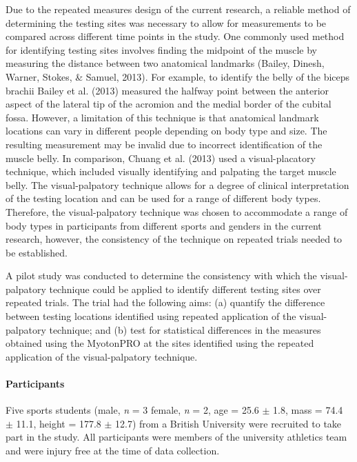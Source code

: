 \documentclass[man,floatsintext]{apa6}
\let\oldparagraph\paragraph
\renewcommand{\paragraph}[1]{\oldparagraph{#1}\mbox{}}
\begin{document}
Due to the repeated measures design of the current research, a reliable method of determining the testing sites was necessary to allow for measurements to be compared across different time points in the study.
One commonly used method for identifying testing sites involves finding the midpoint of the muscle by measuring the distance between two anatomical landmarks (Bailey, Dinesh, Warner, Stokes, \& Samuel, 2013).
For example, to identify the belly of the biceps brachii Bailey et al. (2013) measured the halfway point between the anterior aspect of the lateral tip of the acromion and the medial border of the cubital fossa.
However, a limitation of this technique is that anatomical landmark locations can vary in different people depending on body type and size.
The resulting measurement may be invalid due to incorrect identification of the muscle belly.
In comparison, Chuang et al. (2013) used a visual-placatory technique, which included visually identifying and palpating the target muscle belly.
The visual-palpatory technique allows for a degree of clinical interpretation of the testing location and can be used for a range of different body types.
Therefore, the visual-palpatory technique was chosen to accommodate a range of body types in participants from different sports and genders in the current research, however, the consistency of the technique on repeated trials needed to be established.

A pilot study was conducted to determine the consistency with which the visual-palpatory technique could be applied to identify different testing sites over repeated trials.
The trial had the following aims: (a) quantify the difference between testing locations identified using repeated application of the visual-palpatory technique; and (b) test for statistical differences in the measures obtained using the MyotonPRO at the sites identified using the repeated application of the visual-palpatory technique.

\hypertarget{participants}{%
\paragraph{Participants}\label{participants}}

Five sports students (male, \emph{n} = 3 female, \emph{n} = 2, age = 25.6 \(\pm\) 1.8, mass = 74.4 \(\pm\) 11.1, height = 177.8 \(\pm\) 12.7) from a British University were recruited to take part in the study.
All participants were members of the university athletics team and were injury free at the time of data collection.
\end{document}
